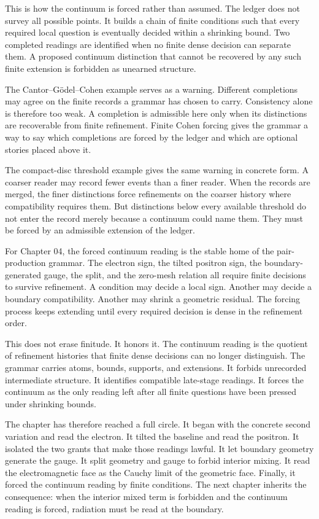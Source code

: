 This is how the continuum is forced rather than assumed. The ledger does not
survey all possible points. It builds a chain of finite conditions such that
every required local question is eventually decided within a shrinking
bound. Two completed readings are identified when no finite dense decision
can separate them. A proposed continuum distinction that cannot be recovered
by any such finite extension is forbidden as unearned structure.

The Cantor--G\"odel--Cohen example serves as a warning. Different
completions may agree on the finite records a grammar has chosen to carry.
Consistency alone is therefore too weak. A completion is admissible here
only when its distinctions are recoverable from finite refinement. Finite
Cohen forcing gives the grammar a way to say which completions are forced by
the ledger and which are optional stories placed above it.

The compact-disc threshold example gives the same warning in concrete form.
A coarser reader may record fewer events than a finer reader. When the
records are merged, the finer distinctions force refinements on the coarser
history where compatibility requires them. But distinctions below every
available threshold do not enter the record merely because a continuum could
name them. They must be forced by an admissible extension of the ledger.

For Chapter 04, the forced continuum reading is the stable home of the
pair-production grammar. The electron sign, the tilted positron sign, the
boundary-generated gauge, the split, and the zero-mesh relation all require
finite decisions to survive refinement. A condition may decide a local sign.
Another may decide a boundary compatibility. Another may shrink a geometric
residual. The forcing process keeps extending until every required decision
is dense in the refinement order.

This does not erase finitude. It honors it. The continuum reading is the
quotient of refinement histories that finite dense decisions can no longer
distinguish. The grammar carries atoms, bounds, supports, and extensions. It
forbids unrecorded intermediate structure. It identifies compatible
late-stage readings. It forces the continuum as the only reading left after
all finite questions have been pressed under shrinking bounds.

The chapter has therefore reached a full circle. It began with the concrete
second variation and read the electron. It tilted the baseline and read the
positron. It isolated the two grants that make those readings lawful. It let
boundary geometry generate the gauge. It split geometry and gauge to forbid
interior mixing. It read the electromagnetic face as the Cauchy limit of the
geometric face. Finally, it forced the continuum reading by finite
conditions. The next chapter inherits the consequence: when the interior
mixed term is forbidden and the continuum reading is forced, radiation must
be read at the boundary.

